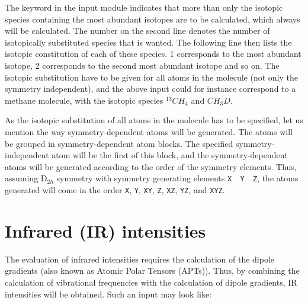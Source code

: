 The keyword  in the  input module
indicates that more than only the isotopic species containing the most
abundant isotopes are to be calculated, which always will be
calculated. The number on the second line denotes the number of
isotopically substituted species that is wanted. The following line then
lists the isotopic constitution of each of these species. 1
corresponds to the most abundant isotope, 2 corresponds to the second
most abundant isotope and so on. The isotopic substitution have to be
given for all atoms in the molecule (not only the symmetry
independent), and the above input could for instance correspond to a
methane molecule, with the isotopic species $^{13}CH_4$
and $CH_3D$.

As the isotopic substitution of all atoms in the molecule has to be
specified, let us mention the way symmetry-dependent atoms will be
generated. The atoms will be grouped in symmetry-dependent atom
blocks. The specified symmetry-independent atom will be the first of
this block, and the symmetry-dependent atoms will be generated
according to the order of the symmetry elements. Thus, assuming
D$_{2h}$ symmetry with symmetry generating elements \verb|X  Y  Z|,
the atoms generated will come in the order \verb|X|, \verb|Y|,
\verb|XY|, \verb|Z|, \verb|XZ|, \verb|YZ|, and \verb|XYZ|.

\section{Infrared (IR) intensities}\label{sec:irint}

\begin{center}
\end{center}

 The evaluation of infrared intensities
requires the calculation of the
dipole gradients (also known as Atomic Polar Tensors (APTs)). Thus, by
combining the calculation of vibrational frequencies with the
calculation of dipole gradients, IR intensities will be obtained. Such
an input may look like:

